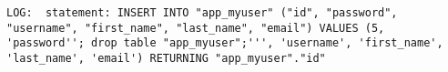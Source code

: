 \begin{lstlisting}[caption={Log of Django injection request},breaklines=true,label={lst:djangoInjectionLog}]
    LOG:  statement: INSERT INTO "app_myuser" ("id", "password", "username", "first_name", "last_name", "email") VALUES (5, 'password''; drop table "app_myuser";''', 'username', 'first_name', 'last_name', 'email') RETURNING "app_myuser"."id"
\end{lstlisting}
